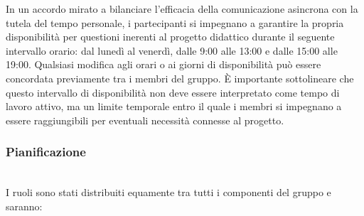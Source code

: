 In un accordo mirato a bilanciare l'efficacia della comunicazione asincrona con la tutela del tempo personale, i partecipanti si impegnano a garantire la propria disponibilità per questioni inerenti al progetto didattico durante il seguente intervallo orario: dal lunedì al venerdì, dalle 9:00 alle 13:00 e dalle 15:00 alle 19:00. Qualsiasi modifica agli orari o ai giorni di disponibilità può essere concordata previamente tra i membri del gruppo. È importante sottolineare che questo intervallo di disponibilità non deve essere interpretato come tempo di lavoro attivo, ma un limite temporale entro il quale i membri si impegnano a essere raggiungibili per eventuali necessità connesse al progetto.
\subsubsection{Pianificazione} \label{sec:pianificazione}
\\
I ruoli sono stati distribuiti equamente tra tutti i componenti del gruppo e saranno:
